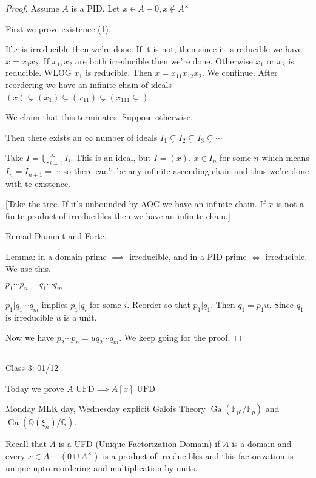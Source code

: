 \documentclass{article}
\theoremstyle{definition}
\begin{document}
\begin{proof}
    Assume \(A\) is a PID. Let \(x\in A-0,x\notin A^\times \)
    
    First we prove existence (1).

    If \(x\) is irreducible then we're done. If it is not, then since it is reducible we have \(x=x_1x_2\). If \(x_1,x_2\) are both irreducible then we're done. Otherwise \(x_1\) or \(x_2\) is reducible. WLOG \(x_1\) is reducible. Then \(x=x_{11}x_{12}x_2\). We continue. After reordering we have an infinite chain of ideals \((x)\subsetneq (x_1)\subsetneq (x_{11})\subsetneq (x_{111}\subsetneq)\).
    
    We claim that this terminates. Suppose otherwise.

    Then there exists an \(\infty \) number of ideals \(I_1\subsetneq I_2\subsetneq I_3\subsetneq\cdots\) 
    
    Take \(I=\bigcup_{i=1}^{\infty} I_i \). This is an ideal, but \(I=(x)\). \(x\in I_n\) for some \(n\) which means \(I_n=I_{n+1}=\cdots \) so there can't be any infinite ascending chain and thus we're done with te existence.

    [Take the tree. If it's unbounded by AOC we have an infinite chain. If \(x\) is not a finite product of irreducibles then we have an infinite chain.]

    Reread Dummit and Forte.

    Lemma: in a domain prime \(\implies \) irreducible, and in a PID prime \(\iff\) irreducible. We use this.

    \(p_1\cdots p_n=q_1\cdots q_m\)

    \(p_1|q_1\cdots q_m\)  implies \(p_1|q_i\) for some \(i\). Reorder so that \(p_1|q_1\). Then \(q_1=p_1u\). Since \(q_1\) is irreducible \(u\) is a unit.
    
    Now we have \(p_2\cdots p_n=uq_2\cdots q_m\). We keep going for the proof. 

\end{proof}

\hrule
\hfil

Class 3: 01/12

Today we prove \(A \text{ UFD} \implies A[x] \text{ UFD} \) 

Monday MLK day, Wednesday explicit Galois Theory \(\operatorname{Ga}(\mathbb{F}_{p^r}/\mathbb{F}_p)\) and \(\operatorname{Ga}(\mathbb{Q}(\xi_n)/\mathbb{Q} )\). 

Recall that \(A\) is a UFD (Unique Factorization Domain) if \(A\) is a domain and every \(x \in A - (0 \cup A^\times )\) is a product of irreducibles and this factorization is unique upto reordering and multiplication by units.
\end{document}
